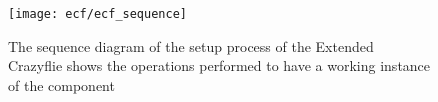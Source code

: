 \begin{figure}[tb]
    \centering
    \texttt{[image: ecf/ecf\_sequence]} 
    \caption[ECF initialization sequence diagram]{The sequence diagram of the setup process of the Extended Crazyflie shows the operations performed to have a working instance of the component}\label{fig:ecf_sequence}
\end{figure}







